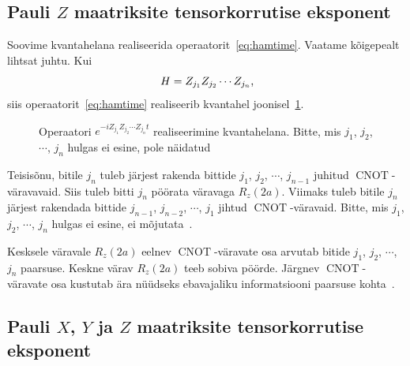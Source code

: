 \documentclass[12pt]{article}
\def\cnot{\mathop{\mathrm{CNOT}}}
\begin{document}
\subsection{Pauli \(Z\) maatriksite tensorkorrutise eksponent}

Soovime kvantahelana realiseerida operaatorit~\ref{eq:hamtime}.
Vaatame kõigepealt lihtsat juhtu.
Kui
\begin{equation}
  H=Z_{j_1}Z_{j_2}\cdots Z_{j_n}\rlap{,}
\end{equation}
siis operaatorit~\ref{eq:hamtime} realiseerib kvantahel joonisel~\ref{f:expz}.

\begin{figure}[h]
  \centering
  \caption{Operaatori \(e^{-iZ_{j_1}Z_{j_2}\cdots Z_{j_n}t}\) realiseerimine kvantahelana. Bitte, mis \(j_1\), \(j_2\), \(\cdots\), \(j_n\) hulgas ei esine, pole näidatud}
  \label{f:expz}
\end{figure}

Teisisõnu, bitile \(j_n\) tuleb järjest rakenda bittide \(j_1\), \(j_2\), \(\cdots\), \(j_{n-1}\) juhitud \(\cnot\)-väravavaid.
Siis tuleb bitti \(j_n\) pöörata väravaga \(R_z(2a)\).
Viimaks tuleb bitile \(j_n\) järjest rakendada bittide \(j_{n-1}\), \(j_{n-2}\), \(\cdots\), \(j_1\) jihtud \(\cnot\)-väravaid.
Bitte, mis \(j_1\), \(j_2\), \(\cdots\), \(j_n\) hulgas ei esine, ei mõjutata~\cite{mansky+etal}.

Kesksele väravale \(R_z(2a)\) eelnev \(\cnot\)-väravate osa arvutab bitide \(j_1\), \(j_2\), \(\cdots\), \(j_n\) paarsuse.
Keskne värav \(R_z(2a)\) teeb sobiva pöörde.
Järgnev \(\cnot\)-väravate osa kustutab ära nüüdseks ebavajaliku informatsiooni paarsuse kohta~\cite{nielsen+chuang}.

\subsection{Pauli \(X\), \(Y\) ja \(Z\) maatriksite tensorkorrutise eksponent}
\end{document}
